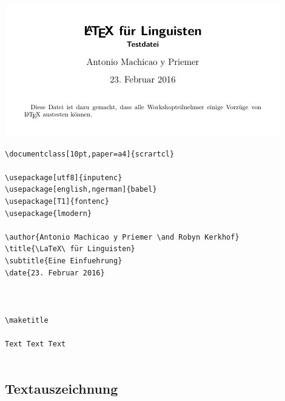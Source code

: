 \begin{frame}[fragile]

\centering
\includegraphics[width=0.75\linewidth]{../../texfiles-beamer/tex-material/WissArb-latex/latexTest4pdf}


\end{frame}


\begin{frame}[fragile]

{\small
\begin{lstlisting}
\documentclass[10pt,paper=a4]{scrartcl}

\usepackage[utf8]{inputenc}
\usepackage[english,ngerman]{babel}
\usepackage[T1]{fontenc}
\usepackage{lmodern}

\author{Antonio Machicao y Priemer \and Robyn Kerkhof}
\title{\LaTeX\ für Linguisten}
\subtitle{Eine Einfuehrung}
\date{23. Februar 2016}



\maketitle

Text Text Text


\end{lstlisting}
}
\end{frame}


\subsection{Textauszeichnung}

